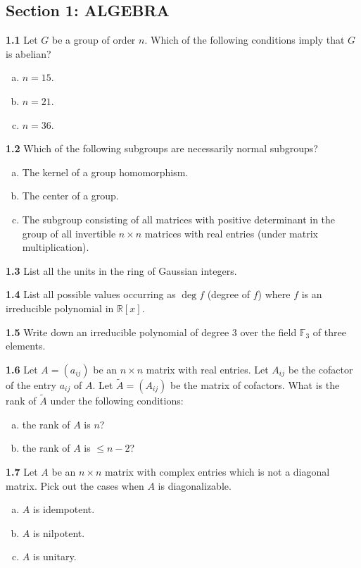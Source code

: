 \documentclass[11pt,a4paper]{article}
\newcommand{\R}{\mathbb{R}}
\newcommand{\F}{\mathbb{F}}
\newcommand{\examsec}[1]{%
  \subsection*{#1}
  \vspace{-2pt}
}
\newcommand{\qitem}[1]{\par\medskip\noindent\textbf{#1}\hspace{0.5em}}
\begin{document}
\examsec{Section 1: ALGEBRA}

\qitem{1.1} Let $G$ be a group of order $n$. Which of the following conditions imply that $G$ is abelian?
\begin{enumerate}[a.]
  \item $n = 15$.
  \item $n = 21$.
  \item $n = 36$.
\end{enumerate}

\qitem{1.2} Which of the following subgroups are necessarily normal subgroups?
\begin{enumerate}[a.]
  \item The kernel of a group homomorphism.
  \item The center of a group.
  \item The subgroup consisting of all matrices with positive determinant in the group of all invertible $n \times n$ matrices with real entries (under matrix multiplication).
\end{enumerate}

\qitem{1.3} List all the units in the ring of Gaussian integers.

\qitem{1.4} List all possible values occurring as $\deg f$ (degree of $f$) where $f$ is an irreducible polynomial in $\R[x]$.

\qitem{1.5} Write down an irreducible polynomial of degree $3$ over the field $\F_3$ of three elements.

\qitem{1.6} Let $A = (a_{ij})$ be an $n \times n$ matrix with real entries. Let $A_{ij}$ be the cofactor of the entry $a_{ij}$ of $A$. Let $\widetilde{A} = (A_{ij})$ be the matrix of cofactors. What is the rank of $\widetilde{A}$ under the following conditions:
\begin{enumerate}[(a)]
  \item the rank of $A$ is $n$?
  \item the rank of $A$ is $\le n - 2$?
\end{enumerate}

\qitem{1.7} Let $A$ be an $n \times n$ matrix with complex entries which is not a diagonal matrix. Pick out the cases when $A$ is diagonalizable.
\begin{enumerate}[a.]
  \item $A$ is idempotent.
  \item $A$ is nilpotent.
  \item $A$ is unitary.
\end{enumerate}
\end{document}
